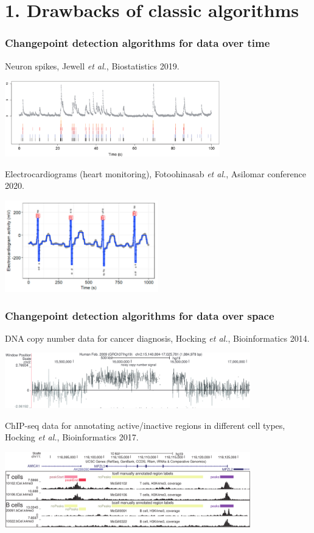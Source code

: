 \documentclass{beamer}
\begin{document}
\section{1. Drawbacks of classic algorithms} 
\begin{frame}
  \frametitle{Changepoint detection algorithms for data over time}
  Neuron spikes, Jewell \emph{et al.}, Biostatistics 2019.

  \includegraphics[width=0.7\textwidth]{intro-neuroscience} 

  Electrocardiograms (heart monitoring), 
  Fotoohinasab \emph{et al.}, 
  Asilomar conference 2020.

  \includegraphics[width=0.5\textwidth]{intro-ecg} 

\end{frame}

\begin{frame}
  \frametitle{Changepoint detection algorithms for data over space}

  DNA copy number data for cancer diagnosis, Hocking \emph{et
    al.}, Bioinformatics 2014.

  \includegraphics[width=0.8\textwidth]{intro-breakpoints}

  ChIP-seq data for annotating active/inactive regions in different cell types, Hocking 
  \emph{et al.}, Bioinformatics 2017.

  \includegraphics[width=0.8\textwidth]{intro-peaks}

\end{frame}
\end{document}
